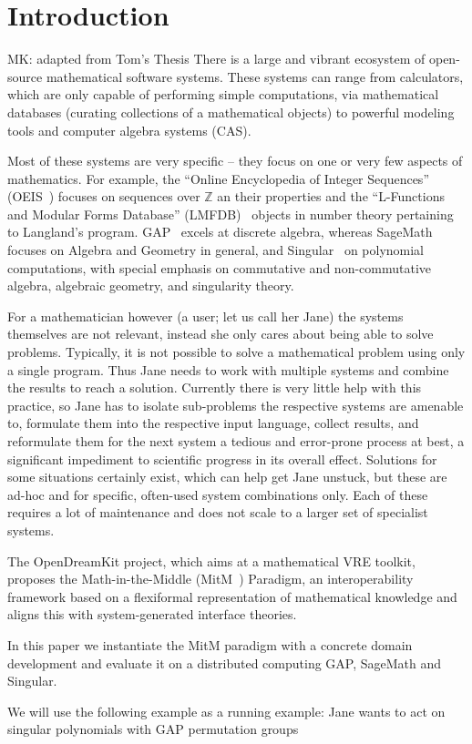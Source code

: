 \section{Introduction}\label{sec:intro}

\begin{newpart}{MK: adapted from Tom's Thesis}
There is a large and vibrant ecosystem of open-source mathematical software systems.
These systems can range from calculators, which are only capable of performing simple
computations, via mathematical databases (curating collections of a mathematical objects)
to powerful modeling tools and computer algebra systems (CAS). 

Most of these systems are very specific -- they focus on one or very few aspects of
mathematics.  For example, the ``Online Encyclopedia of Integer Sequences''
(OEIS~\cite{Sloane:oeis12,oeis}) focuses on sequences over $\mathbb{Z}$ an their
properties and the ``L-Functions and Modular Forms Database''
(LMFDB)~\cite{Cremona:LMFDB16,lmfdb:on} objects in number theory pertaining to Langland's
program.  GAP~\cite{GAP:on} excels at discrete algebra, whereas
SageMath~\cite{SageMath:on} focuses on Algebra and Geometry in general, and
Singular~\cite{singular:on} on polynomial computations, with special emphasis on
commutative and non-commutative algebra, algebraic geometry, and singularity theory.

For a mathematician however (a user; let us call her Jane) the systems themselves are not relevant, instead she only cares about being able to solve problems. 
Typically, it is not possible to solve a mathematical problem using only a single program. 
Thus Jane needs to work with multiple systems and combine the results to reach a solution. 
Currently there is very little help with this practice, so Jane has to isolate sub-problems the respective systems are amenable to, formulate them into the respective input language, collect results, and reformulate them for the next system a tedious and error-prone process at best, a significant impediment to scientific progress in its overall effect. 
Solutions for some situations certainly exist, which can help get Jane unstuck, but these are ad-hoc and for specific, often-used system combinations only. 
Each of these requires a lot of maintenance and does not scale to a larger set of specialist systems. 

The OpenDreamKit project, which aims at a mathematical VRE toolkit, proposes the Math-in-the-Middle (MitM~\cite{DehKohKon:iop16}) Paradigm, an interoperability framework based on a flexiformal
representation of mathematical knowledge and aligns this with system-generated interface
theories. 

In this paper we instantiate the MitM paradigm with a concrete domain development and
evaluate it on a distributed computing GAP, SageMath and Singular.

We will use the following example as a running example: Jane wants to act on singular
polynomials with GAP permutation groups

\end{newpart}

